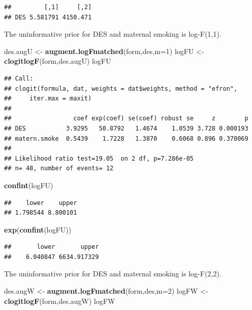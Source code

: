 \documentclass[
]{article}
\newenvironment{Shaded}{\begin{snugshade}}{\end{snugshade}}
\newcommand{\AttributeTok}[1]{\textcolor[rgb]{0.13,0.29,0.53}{#1}}
\newcommand{\DecValTok}[1]{\textcolor[rgb]{0.00,0.00,0.81}{#1}}
\newcommand{\FunctionTok}[1]{\textcolor[rgb]{0.13,0.29,0.53}{\textbf{#1}}}
\newcommand{\NormalTok}[1]{#1}
\newcommand{\OtherTok}[1]{\textcolor[rgb]{0.56,0.35,0.01}{#1}}
\begin{document}
\begin{verbatim}
##         [,1]     [,2]
## DES 5.581791 4150.471
\end{verbatim}

The uninformative prior for DES and maternal smoking is log-F(1,1).

\begin{Shaded}
\begin{Highlighting}[]
\NormalTok{des.augU }\OtherTok{\textless{}{-}} \FunctionTok{augment.logFmatched}\NormalTok{(form,des,}\AttributeTok{m=}\DecValTok{1}\NormalTok{)}
\NormalTok{logFU }\OtherTok{\textless{}{-}} \FunctionTok{clogitlogF}\NormalTok{(form,des.augU)}
\NormalTok{logFU}
\end{Highlighting}
\end{Shaded}

\begin{verbatim}
## Call:
## clogit(formula, dat, weights = dat$weights, method = "efron", 
##     iter.max = maxit)
## 
##                 coef exp(coef) se(coef) robust se     z        p
## DES           3.9295   50.8792   1.4674    1.0539 3.728 0.000193
## matern.smoke  0.5439    1.7228   1.3870    0.6068 0.896 0.370069
## 
## Likelihood ratio test=19.05  on 2 df, p=7.286e-05
## n= 48, number of events= 12
\end{verbatim}

\begin{Shaded}
\begin{Highlighting}[]
\FunctionTok{confint}\NormalTok{(logFU)}
\end{Highlighting}
\end{Shaded}

\begin{verbatim}
##    lower    upper 
## 1.798544 8.800101
\end{verbatim}

\begin{Shaded}
\begin{Highlighting}[]
\FunctionTok{exp}\NormalTok{(}\FunctionTok{confint}\NormalTok{(logFU))}
\end{Highlighting}
\end{Shaded}

\begin{verbatim}
##       lower       upper 
##    6.040847 6634.917329
\end{verbatim}

The uninformative prior for DES and maternal smoking is log-F(2,2).

\begin{Shaded}
\begin{Highlighting}[]
\NormalTok{des.augW }\OtherTok{\textless{}{-}} \FunctionTok{augment.logFmatched}\NormalTok{(form,des,}\AttributeTok{m=}\DecValTok{2}\NormalTok{)}
\NormalTok{logFW }\OtherTok{\textless{}{-}} \FunctionTok{clogitlogF}\NormalTok{(form,des.augW)}
\NormalTok{logFW}
\end{Highlighting}
\end{Shaded}
\end{document}
